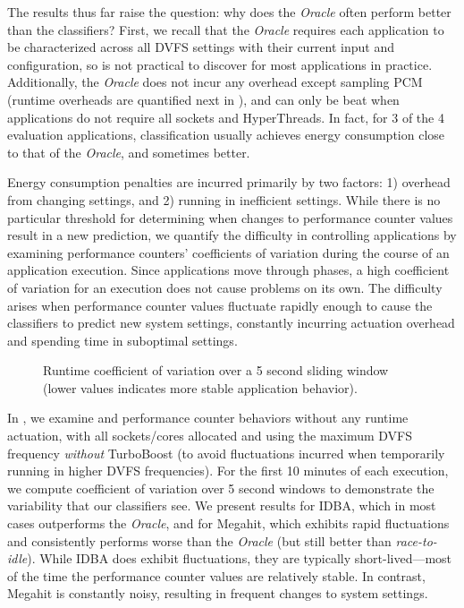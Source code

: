 The results thus far raise the question: why does the \emph{Oracle} often perform better than the classifiers?
First, we recall that the \emph{Oracle} requires each application to be characterized across all DVFS settings with their current input and configuration, so is not practical to discover for most applications in practice.
Additionally, the \emph{Oracle} does not incur any overhead except sampling PCM (runtime overheads are quantified next in ), and can only be beat when applications do not require all sockets and HyperThreads.
In fact, for 3 of the 4 evaluation applications, classification usually achieves energy consumption close to that of the \emph{Oracle}, and sometimes better.

Energy consumption penalties are incurred primarily by two factors: 1) overhead from changing settings, and 2) running in inefficient settings.
While there is no particular threshold for determining when changes to performance counter values result in a new prediction, we quantify the difficulty in controlling applications by examining performance counters' coefficients of variation during the course of an application execution.
Since applications move through phases, a high coefficient of variation for an execution does not cause problems on its own.
The difficulty arises when performance counter values fluctuate rapidly enough to cause the classifiers to predict new system settings, constantly incurring actuation overhead and spending time in suboptimal settings.

\begin{figure}[t]
  \centering
  
  \caption{Runtime coefficient of variation over a 5 second sliding window (lower values indicates more stable application behavior).}
  \label{fig:cv}
\end{figure}

In , we examine  and  performance counter behaviors without any runtime actuation, with all sockets/cores allocated and using the maximum DVFS frequency \emph{without} TurboBoost (to avoid fluctuations incurred when temporarily running in higher DVFS frequencies).
For the first 10 minutes of each execution, we compute coefficient of variation over 5 second windows to demonstrate the variability that our classifiers see.
We present results for IDBA, which in most cases outperforms the \emph{Oracle}, and for Megahit, which exhibits rapid fluctuations and consistently performs worse than the \emph{Oracle} (but still better than \emph{race-to-idle}).
While IDBA does exhibit fluctuations, they are typically short-lived---most of the time the performance counter values are relatively stable.
In contrast, Megahit is constantly noisy, resulting in frequent changes to system settings.

